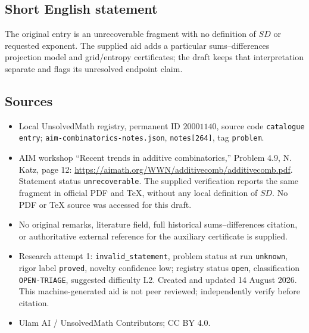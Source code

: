 \documentclass[11pt]{article}
\begin{document}
\subsection{Short English statement}
The original entry is an unrecoverable fragment with no definition of \(SD\) or requested exponent. The supplied aid adds a particular sums--differences projection model and grid/entropy certificates; the draft keeps that interpretation separate and flags its unresolved endpoint claim.
\subsection{Sources}
\begin{itemize}
\item Local UnsolvedMath registry, permanent ID \(20001140\), source code \texttt{catalogue entry}; \texttt{aim-combinatorics-notes.json}, \texttt{notes[264]}, tag \texttt{problem}.
\item AIM workshop ``Recent trends in additive combinatorics,'' Problem 4.9, N. Katz, page 12: \url{https://aimath.org/WWN/additivecomb/additivecomb.pdf}. Statement status \texttt{unrecoverable}. The supplied verification reports the same fragment in official PDF and TeX, without any local definition of \(SD\). No PDF or TeX source was accessed for this draft.
\item No original remarks, literature field, full historical sums--differences citation, or authoritative external reference for the auxiliary certificate is supplied.
\item Research attempt 1: \texttt{invalid\_statement}, problem status at run \texttt{unknown}, rigor label \texttt{proved}, novelty confidence low; registry status \texttt{open}, classification \texttt{OPEN-TRIAGE}, suggested difficulty L2. Created and updated 14 August 2026. This machine-generated aid is not peer reviewed; independently verify before citation.
\item Ulam AI / UnsolvedMath Contributors; CC BY 4.0.
\end{itemize}
\end{document}
